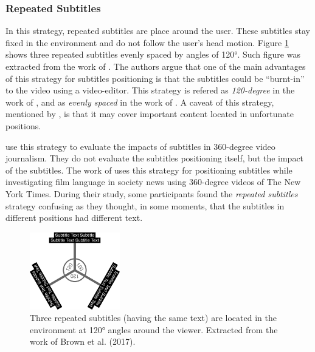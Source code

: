 \subsubsection{Repeated Subtitles}
\label{subsubsection:repeated_subtitles}

In this strategy, repeated subtitles are place around the user. These subtitles stay fixed in the environment and do not follow the user's head motion. Figure \ref{fig:120_subtitles} shows three repeated subtitles evenly spaced by angles of 120°. Such figure was extracted from the work of . The authors argue that one of the main advantages of this strategy for subtitles positioning is that the subtitles could be ``burnt-in'' to the video using a video-editor. This strategy is refered as \emph{120-degree} in the work of , and as \emph{evenly spaced} in the work of . A caveat of this strategy, mentioned by , is that it may cover important content located in unfortunate positions. 

 use this strategy to evaluate the impacts of subtitles in 360-degree video journalism. They do not evaluate the subtitles positioning itself, but the impact of the subtitles. The work of  uses this strategy for positioning subtitles while investigating film language in society news using 360-degree videos of The New York Times. During their study, some participants found the \emph{repeated subtitles} strategy confusing as they thought, in some moments, that the subtitles in different positions had different text.

\begin{figure}[!ht]
    \centering
    \includegraphics[width=0.35\textwidth]{img/120_subtitles.png}
    \caption{Three repeated subtitles (having the same text) are located in the environment at 120° angles around the viewer. Extracted from the work of Brown et al. (2017).}
    \label{fig:120_subtitles}
\end{figure}

